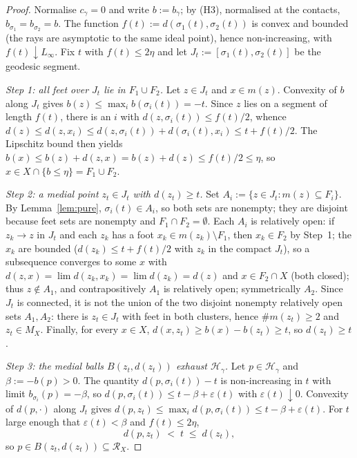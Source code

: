 \documentclass[11pt]{article}
\theoremstyle{remark}
\newcommand{\X}{X}
\newcommand{\Mx}{M_{\X}}
\newcommand{\Rx}{\mathcal{R}_{\X}}
\newcommand{\Hb}[1]{\mathcal{H}_{#1}}
\newcommand{\B}{B}
\begin{document}
\begin{proof}
Normalise $c_{\gamma}=0$ and write $b:=b_{\gamma}$; by (H3),
normalised at the contacts, $b_{\sigma_{1}}=b_{\sigma_{2}}=b$. The
function $f(t):=d(\sigma_{1}(t),\sigma_{2}(t))$ is convex and bounded
(the rays are asymptotic to the same ideal point), hence
non-increasing, with $f(t)\downarrow L_{\infty}$. Fix $t$ with
$f(t)\le2\eta$ and let $J_{t}:=[\sigma_{1}(t),\sigma_{2}(t)]$ be the
geodesic segment.

\emph{Step 1: all feet over $J_{t}$ lie in $F_{1}\cup F_{2}$.} Let
$z\in J_{t}$ and $x\in m(z)$. Convexity of $b$ along $J_{t}$ gives
$b(z)\le\max_{i}b(\sigma_{i}(t))=-t$. Since $z$ lies on a segment of
length $f(t)$, there is an $i$ with $d(z,\sigma_{i}(t))\le f(t)/2$,
whence
$d(z)\le d(z,x_{i})\le d(z,\sigma_{i}(t))+d(\sigma_{i}(t),x_{i})\le
t+f(t)/2$. The Lipschitz bound then yields
$b(x)\le b(z)+d(z,x)=b(z)+d(z)\le f(t)/2\le\eta$, so
$x\in\X\cap\{b\le\eta\}=F_{1}\cup F_{2}$.

\emph{Step 2: a medial point $z_{t}\in J_{t}$ with $d(z_{t})\ge t$.}
Set $A_{i}:=\{z\in J_{t} : m(z)\subseteq F_{i}\}$. By
Lemma~\ref{lem:pure}, $\sigma_{i}(t)\in A_{i}$, so both sets are
nonempty; they are disjoint because feet sets are nonempty and
$F_{1}\cap F_{2}=\emptyset$. Each $A_{i}$ is relatively open: if
$z_{k}\to z$ in $J_{t}$ and each $z_{k}$ has a foot
$x_{k}\in m(z_{k})\setminus F_{1}$, then $x_{k}\in F_{2}$ by Step~1;
the $x_{k}$ are bounded ($d(z_{k})\le t+f(t)/2$ with $z_{k}$ in the
compact $J_{t}$), so a subsequence converges to some $x$ with
$d(z,x)=\lim d(z_{k},x_{k})=\lim d(z_{k})=d(z)$ and
$x\in F_{2}\cap\X$ (both closed); thus $z\notin A_{1}$, and
contrapositively $A_{1}$ is relatively open; symmetrically $A_{2}$.
Since $J_{t}$ is connected, it is not the union of the two disjoint
nonempty relatively open sets $A_{1},A_{2}$: there is
$z_{t}\in J_{t}$ with feet in both clusters, hence
$\#m(z_{t})\ge2$ and $z_{t}\in\Mx$. Finally, for every $x\in\X$,
$d(x,z_{t})\ge b(x)-b(z_{t})\ge t$, so $d(z_{t})\ge t$.

\emph{Step 3: the medial balls $\B(z_{t},d(z_{t}))$ exhaust
$\Hb{\gamma}$.} Let $p\in\Hb{\gamma}$ and $\beta:=-b(p)>0$. The
quantity $d(p,\sigma_{i}(t))-t$ is non-increasing in $t$ with limit
$b_{\sigma_{i}}(p)=-\beta$, so
$d(p,\sigma_{i}(t))\le t-\beta+\varepsilon(t)$ with
$\varepsilon(t)\downarrow0$. Convexity of $d(p,\cdot)$ along
$J_{t}$ gives
$d(p,z_{t})\le\max_{i}d(p,\sigma_{i}(t))\le t-\beta+\varepsilon(t)$.
For $t$ large enough that $\varepsilon(t)<\beta$ and $f(t)\le2\eta$,
\[
d(p,z_{t})\;<\;t\;\le\;d(z_{t}),
\]
so $p\in\B(z_{t},d(z_{t}))\subseteq\Rx$.
\end{proof}
\end{document}
